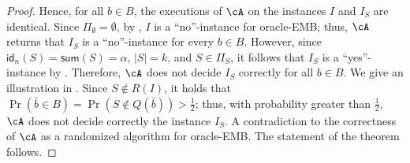 \begin{proof}
	Hence, for all $b \in B$,  the executions of $\cA$ on the instances $I$ and $I_S$ are identical.
		Since $\Pi_{\emptyset} = \emptyset$, by %
		, $I$ is a ``no''-instance for oracle-EMB; thus, $\cA$ returns that $I_S$ is a ``no''-instance for every $b\in B$. However, since $\textsf{id}_n(S) = \textsf{sum}(S) = \alpha$, $|S| = k$, and $S \in \Pi_{S}$, it follows that $I_S$ is a ``yes''-instance by .  
		Therefore, $\cA$ does not decide $I_S$ correctly for all $b \in B$.  We give an illustration in . Since  $S \notin R(I)$, it holds that $\Pr \left( \bar{b} \in B \right) = \Pr \left(S \notin Q(\bar{b}) \right) > \frac{1}{2}$; thus, with probability greater than $\frac{1}{2}$, $\cA$ does not decide correctly the instance $I_S$. 
		A contradiction to the correctness of  $\cA$  as a randomized algorithm for oracle-EMB. The statement of the theorem follows. 
	\end{proof}
	
	
	
	

	